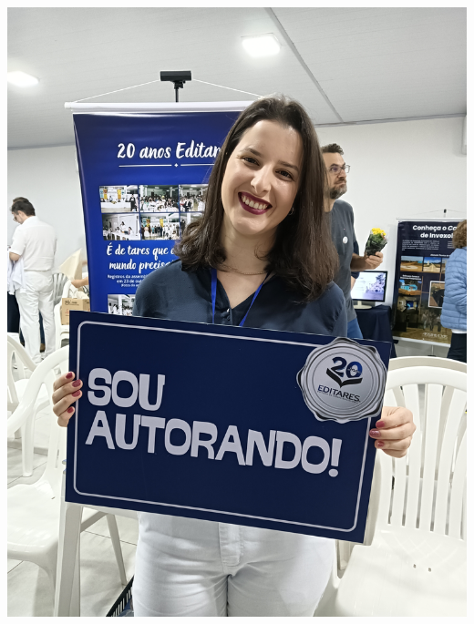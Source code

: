 \documentclass{gescons}
\begin{document}
  \begin{minipage}[b]{0.32\textwidth}
    \includegraphics[width=\linewidth]{articles/resumo/fotos/materia2/IMG20241208144202.jpg}
  \end{minipage}\hfill
\end{document}
